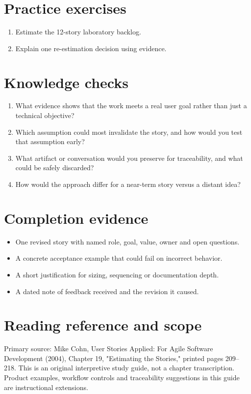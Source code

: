 \documentclass[11pt,letterpaper]{article}
\begin{document}
\section{Practice exercises}
\begin{enumerate}[leftmargin=*,itemsep=3pt]
\item Estimate the 12-story laboratory backlog.
\item Explain one re-estimation decision using evidence.
\end{enumerate}
\section{Knowledge checks}
\begin{enumerate}[leftmargin=*,itemsep=3pt]
\item What evidence shows that the work meets a real user goal rather than just a technical objective?
\item Which assumption could most invalidate the story, and how would you test that assumption early?
\item What artifact or conversation would you preserve for traceability, and what could be safely discarded?
\item How would the approach differ for a near-term story versus a distant idea?
\end{enumerate}
\section{Completion evidence}
\begin{itemize}[leftmargin=*,itemsep=2pt]
\item One revised story with named role, goal, value, owner and open questions.
\item A concrete acceptance example that could fail on incorrect behavior.
\item A short justification for sizing, sequencing or documentation depth.
\item A dated note of feedback received and the revision it caused.
\end{itemize}
\section{Reading reference and scope}
Primary source: Mike Cohn, User Stories Applied: For Agile Software Development (2004), Chapter 19, "Estimating the Stories," printed pages 209–218. This is an original interpretive study guide, not a chapter transcription. Product examples, workflow controls and traceability suggestions in this guide are instructional extensions.
\end{document}
